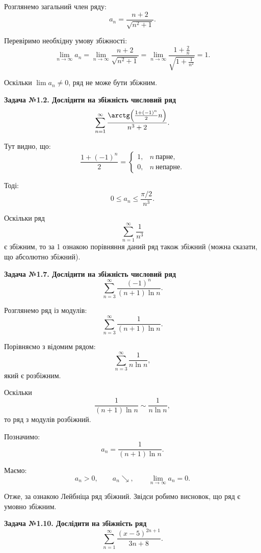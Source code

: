 \documentclass[12pt,a4paper]{article}
\begin{document}
Розглянемо загальний член ряду:
\[
a_n=\frac{n+2}{\sqrt{n^2+1}}.
\]

Перевіримо необхідну умову збіжності:
\[
\lim_{n\to\infty}a_n
=\lim_{n\to\infty}\frac{n+2}{\sqrt{n^2+1}}
=\lim_{n\to\infty}\frac{1+\frac{2}{n}}{\sqrt{1+\frac{1}{n^2}}}
=1.
\]

Оскільки \(\lim a_n\neq0\), ряд не може бути збіжним.

\vspace{1em}

\textbf{Задача №1.2. Дослідити на збіжність числовий ряд}
\[
\sum_{n=1}^{\infty}\frac{\arctg\!\left(\frac{1+(-1)^n}{2}n\right)}{n^3+2}.
\]

Тут видно, що:
\[
\frac{1+(-1)^n}{2}=
\begin{cases}
1, & n\ \text{парне},\\
0, & n\ \text{непарне}.
\end{cases}
\]

Тоді:
\[
0\le a_n\le\frac{\pi/2}{n^3}.
\]

Оскільки ряд
\[
\sum_{n=1}^{\infty}\frac{1}{n^3}
\]
є збіжним, то за 1 ознакою порівняння даний ряд також збіжний (можна сказати, що абсолютно збіжний).

\vspace{1em}

\textbf{Задача №1.7. Дослідити на збіжність числовий ряд}
\[
\sum_{n=3}^{\infty}\frac{(-1)^n}{(n+1)\ln n}.
\]

Розглянемо ряд із модулів:
\[
\sum_{n=3}^{\infty}\frac{1}{(n+1)\ln n}.
\]

Порівняємо з відомим рядом:
\[
\sum_{n=3}^{\infty}\frac{1}{n\ln n},
\]
який є розбіжним.

Оскільки
\[
\frac{1}{(n+1)\ln n}\sim\frac{1}{n\ln n},
\]
то ряд з модулів розбіжний.

\vspace{1em}

Позначимо:
\[
a_n=\frac{1}{(n+1)\ln n}.
\]

Маємо:
\[
a_n>0,\qquad a_n\searrow,\qquad \lim_{n\to\infty}a_n=0.
\]

Отже, за ознакою Лейбніца ряд збіжний. Звідси робимо висновок, що ряд є умовно збіжним.

\vspace{1em}

\textbf{Задача №1.10. Дослідити на збіжність ряд}
\[
\sum_{n=1}^{\infty}\frac{(x-5)^{2n+1}}{3n+8}.
\]
\end{document}
